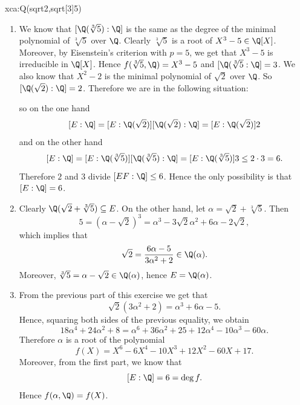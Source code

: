 \begin{sol}{xca:Q(sqrt2,sqrt[3]5)}\
    \begin{enumerate}
        \item      
        We know that $[\Q(\sqrt[3]{5}):\Q]$ is the same as
    the degree of the minimal polynomial of $\sqrt[3]{5}$
    over $\Q$.
    Clearly $\sqrt[3]{5}$ is a root of $X^3-5\in\Q[X]$.
    Moreover, by Eisenstein's criterion with
    $p=5$, we get that $X^3-5$ is irreducible in $\Q[X]$.
    Hence $f(\sqrt[3]{5},\Q)=X^3-5$ and $[\Q(\sqrt[3]{5}:\Q]=3$.
    We also know that $X^2-2$ is the minimal polynomial of $\sqrt{2}$ over $\Q$. 
    So $[\Q(\sqrt{2}):\Q]=2$.
    Therefore we are in the following situation:
    \
    \begin{center}
    \end{center}
    so on the one hand
    \[
    [E:\Q]=[E:\Q(\sqrt{2})][\Q(\sqrt{2}):\Q]=[E:\Q(\sqrt{2})]2
    \]
    and on the other hand
    \[
    [E:\Q]=[E:\Q(\sqrt[3]{5})][\Q(\sqrt[3]{5}):\Q]=[E:\Q(\sqrt[3]{5})]3\leq 2\cdot 3=6.
    \]
    Therefore $2$ and $3$ divide $[EF:\Q]\leq 6$.
    Hence the only possibility is that $[E:\Q]=6$.
    \item Clearly $\Q(\sqrt{2}+\sqrt[3]{5})\subseteq E$.
    On the other hand, let $\alpha=\sqrt{2}+\sqrt[3]{5}$.
    Then 
    \[
    5=(\alpha-\sqrt{2})^3=\alpha^3-3\sqrt{2}\alpha^2+6\alpha-2\sqrt{2},
    \]
    which implies that 
    \[
    \sqrt{2}=\frac{6\alpha-5}{3\alpha^2+2}\in\Q(\alpha).
    \]
    Moreover, $\sqrt[3]{5}=\alpha-\sqrt{2}\in\Q(\alpha)$, hence $E=\Q(\alpha)$.
    \item From the previous part of this exercise
    we get that 
    \[
    \sqrt{2}(3\alpha^2+2)=\alpha^3+6\alpha-5.
    \]
    Hence, squaring both sides of the previous equality,
    we obtain
    \[
    18\alpha^4+24\alpha^2+8=\alpha^6+36\alpha^2+25+12\alpha^4-10\alpha^3-60\alpha.
    \]
    Therefore $\alpha$ is a root of the 
    polynomial 
    \[
    f(X)=X^6-6X^4-10X^3+12X^2-60X+17.
    \]
    Moreover, from the first part, we know that
    \[
    [E:\Q]=6=\deg f.
    \]
    Hence $f(\alpha,\Q)=f(X)$.
    \end{enumerate}
\end{sol}

